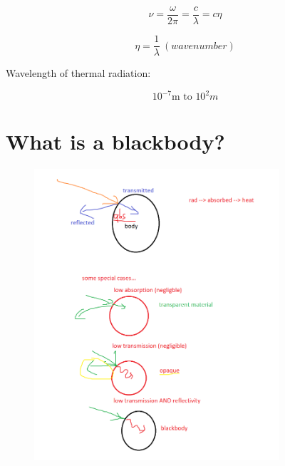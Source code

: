 \documentclass[12pt]{article}
\renewcommand{\_}{\kern-1.5pt\textunderscore\kern-1.5pt}
\begin{document}
\begin{itemize}
 \[  \nu =\frac{ \omega }{2 \pi }=\frac{c}{ \lambda }=c \eta  \] \par

 \[  \eta =\frac{1}{ \lambda }~ \left( wavenumber \right)  \] \par

Wavelength of thermal radiation:\par

 \[ 10^{-7}\text{m to }10^{2}m \] \par


\vspace{\baselineskip}

\end{itemize}\section*{What is a blackbody?}



\begin{figure}[H]
	\begin{Center}
		\includegraphics[width=3.58in,height=4.26in]{./media/image3.png}
	\end{Center}
\end{figure}



\par
\end{document}
